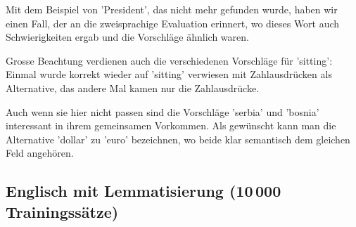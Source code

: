 \documentclass[11pt,twoside,openright]{mpreport}
\begin{document}
Mit dem Beispiel von 'President', das nicht mehr gefunden wurde, haben wir einen Fall, der an die zweisprachige Evaluation erinnert, wo dieses Wort auch Schwierigkeiten ergab und die Vorschläge ähnlich waren.

Grosse Beachtung verdienen auch die verschiedenen Vorschläge für 'sitting': Einmal wurde korrekt wieder auf 'sitting' verwiesen mit Zahlausdrücken als Alternative, das andere Mal kamen nur die Zahlausdrücke.

Auch wenn sie hier nicht passen sind die Vorschläge 'serbia' und 'bosnia' interessant in ihrem gemeinsamen Vorkommen. Als gewünscht kann man die Alternative 'dollar' zu 'euro' bezeichnen, wo beide klar semantisch dem gleichen Feld angehören.

\subsection{Englisch mit Lemmatisierung (10\,000 Trainingssätze)}
\end{document}
